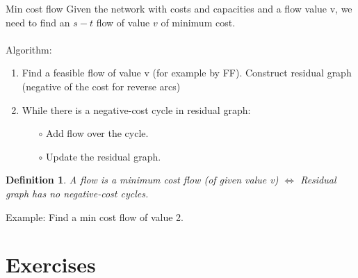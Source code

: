 \documentclass[10pt]{report}
\makeatletter
\numberwithin{dummy}{section}
\theoremstyle{ocrenumbox}
\theoremstyle{grayman}
\newtheorem{definitionTTTT}{Definition}[]
\newenvironment{voc}{\begin{vBox}\begin{definitionTTTT}}{\end{definitionTTTT}\end{vBox}}
\renewcommand{\section}{\@startsection{section}{1}{\z@}
{-4ex \@plus -1ex \@minus -.4ex}
{1ex \@plus.2ex }
{\normalfont\large\sffamily\bfseries}}
\makeatother
\begin{document}
\section{Min cost flow}
Given the network with costs and capacities and a flow value v, we need
to find an $s-t$ flow of value $v$ of minimum cost.\\ \\
Algorithm:
\begin{enumerate}
    \item Find a feasible flow of value v (for example by FF). Construct residual graph (negative of the cost for reverse arcs)
    \item While there is a negative-cost cycle in residual graph:
\begin{itemize}
    \item [$\circ$]Add flow over the cycle.
    \item [$\circ$]Update the residual graph.
\end{itemize}
\end{enumerate}
\begin{voc}
    A flow is a minimum cost flow (of given value v) $\Longleftrightarrow$ Residual graph has no negative-cost cycles.
\end{voc}
Example: Find a min cost flow of value 2.\\
\begin{minipage}{0.5\textwidth}
\begin{center}
\end{center}
\end{minipage}
\chapter{Exercises}
\end{document}
